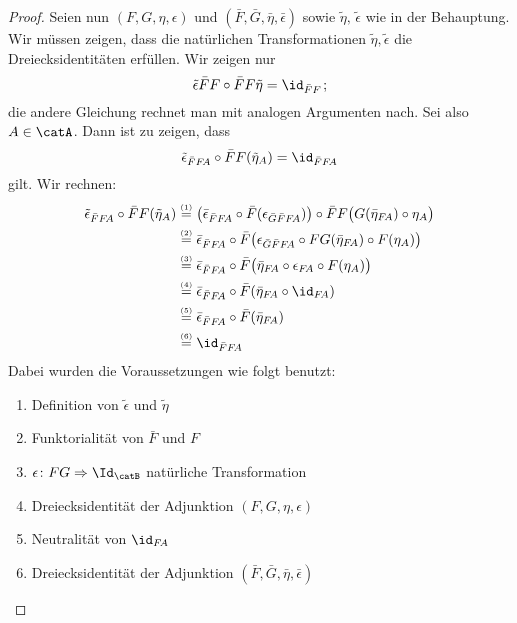 \begin{proof}
    \smallskip\noindent
    Seien nun $(F,G,\eta,\epsilon)$ und $(\bar F, \bar G, \bar\eta,
    \bar\epsilon)$ sowie $\tilde\eta,\,\tilde\epsilon$ wie in der Behauptung.
    Wir müssen zeigen, dass die natürlichen Transformationen
    $\tilde\eta,\tilde\epsilon$ die Dreiecksidentitäten erfüllen.
    Wir zeigen nur
    \[ \tilde\epsilon\bar FF \after \bar FF\tilde\eta = \id_{\bar FF}  \mkern2mu; \]
    die andere Gleichung rechnet man mit analogen Argumenten nach.
    Sei also $A\in\catA$. Dann ist zu zeigen, dass
    \[ \tilde\epsilon_{\bar FF\!A} \after \bar FF(\tilde\eta_A) = \id_{\bar FF\!A} \]
    gilt. Wir rechnen:
    \begin{align*}
        \tilde\epsilon_{\bar FF\!A} \after \bar FF(\tilde\eta_A)
        &\overset{\scriptscriptstyle(1)}=
            \bigl( \bar\epsilon_{\bar FF\!A} \after 
                \bar F(\epsilon_{\bar G\bar FF\!A}) \bigr)
            \after
            \bar FF\bigl( G(\bar\eta_{F\!A})\after \eta_A \bigr)
        \\
        &\overset{\scriptscriptstyle(2)}= 
            \bar\epsilon_{\bar FF\!A} \after 
            \bar F\bigl( 
            \epsilon_{\bar G\bar FF\!A} \after
            FG(\bar\eta_{F\!A})\after F(\eta_A) \bigr)
        \\
        &\overset{\scriptscriptstyle(3)}= 
            \bar\epsilon_{\bar FF\!A} \after 
            \bar F\bigl( 
            \bar\eta_{F\!A}\after \epsilon_{F\!A}
            \after F(\eta_A) \bigr)
        \\
        &\overset{\scriptscriptstyle(4)}= 
            \bar\epsilon_{\bar FF\!A} \after 
            \bar F( \bar\eta_{F\!A}\after \id_{F\!A} )
        \\
        &\overset{\scriptscriptstyle(5)}= 
            \bar\epsilon_{\bar FF\!A} \after 
            \bar F(\bar\eta_{F\!A})
        \\
        &\overset{\scriptscriptstyle(6)}= 
            \id_{\bar FF\!A}
    \end{align*}
    Dabei wurden die Voraussetzungen wie folgt benutzt:
    \begin{enumerate}[(1)]
        \item
            Definition von $\tilde\epsilon$ und $\tilde\eta$
        \item
            Funktorialität von $\bar F$ und $F$
        \item
            $\epsilon\colon FG\nattrafoto\Id_\catB$ natürliche Transformation
        \item
            Dreiecksidentität der Adjunktion $(F,G,\eta,\epsilon)$
        \item
            Neutralität von $\id_{F\!A}$
        \item
            Dreiecksidentität der Adjunktion 
            $(\bar F,\bar G,\bar\eta,\bar\epsilon)$
    \end{enumerate}
\end{proof}
